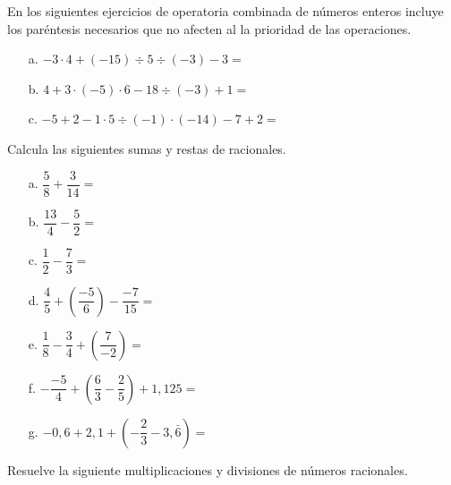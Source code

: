 \documentclass[spanish,letterpaper, 11pt, addpoints, answers]{exam}
\begin{document}
\begin{questions}

\question En los siguientes ejercicios de operatoria combinada de números enteros incluye los paréntesis necesarios que no afecten al la prioridad de las operaciones.\\

\begin{itemize}
  \item[a.] $-3\cdot 4+(-15)\div 5\div (-3)-3=$
  \item[b.] $4+3\cdot (-5)\cdot 6-18\div(-3)+1=$
  \item[c.] $-5+2-1\cdot5\div(-1)\cdot(-14)-7+2 =$  
\end{itemize}

\question Calcula las siguientes sumas y restas de racionales.


  

\begin{itemize}
\item[a.]$\dfrac{5}{8}+\dfrac{3}{14}=$
\vspace{3cm}
\item[b.]$\dfrac{13}{4}-\dfrac{5}{2}=$
\vspace{3cm}
\item[c.]$\dfrac{1}{2}-\dfrac{7}{3}=$
\vspace{3cm}
\item[d.]$\dfrac{4}{5}+\left(\dfrac{-5}{6}\right)-\dfrac{-7}{15}=$
\vspace{3cm}
\item[e.]$\dfrac{1}{8}-\dfrac{3}{4}+\left(\dfrac{7}{-2}\right)=$
\vspace{3cm}
\item[f.]$-\dfrac{-5}{4}+\left(\dfrac{6}{3}-\dfrac{2}{5}\right)+1{,}125=$
\vspace{3cm}
\item[g.]$-0{,}6+2{,}1+(-\dfrac{2}{3}-3{,}\bar{6})=$  
\end{itemize}


\question Resuelve la siguiente multiplicaciones y divisiones de números racionales.

  


\end{questions}
\end{document}
